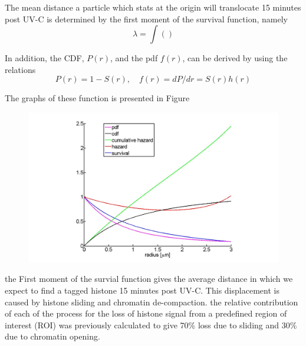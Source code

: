 \documentclass[12pt]{report}
\begin{document}
The mean distance a particle which stats at the origin will translocate 15 minutes post UV-C is determined by the first moment of the survival function, namely
\begin{equation*}
\lambda=\int()
\end{equation*} 

In addition, the CDF, $P(r)$, and the pdf $f(r)$, can be derived by using the relations 
\begin{equation*}
P(r) = 1-S(r), \quad f(r) = dP/dr=S(r)h(r)
\end{equation*}

The graphs of these function is presented in Figure 
\begin{figure}[H]
\centering
\includegraphics[width=0.6\linewidth, height=0.3\textheight]{survivalCdfPdfFunctions}
\caption{}
\label{fig:survivalCdfPdfFunctions}
\end{figure}

the First moment of the survial function gives the average distance in which we expect to find a tagged histone 15 minutes post UV-C. This displacement is caused by histone sliding and chromatin de-compaction.
the relative contribution of each of the process for the loss of histone signal from a predefined region of interest (ROI) was previously calculated to give 70\% loss due to sliding and 30\% due to chromatin opening. 


 


 
\end{document}
